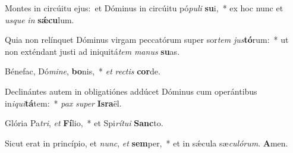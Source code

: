 Montes in circúitu ejus:~\reddagger et Dóminus in circúitu pó\textit{pu}\textit{li} \textbf{su}i,~* ex hoc nunc et \textit{us}\textit{que} \textit{in} \textbf{sǽ}\textbf{cu}lum.

Quia non relínquet Dóminus virgam peccatórum super sor\textit{tem} \textit{jus}\textbf{tó}rum:~* ut non exténdant justi ad iniquitá\textit{tem} \textit{ma}\textit{nus} \textbf{su}as.

Bénefac, Dó\textit{mi}\textit{ne}, \textbf{bo}nis,~* \textit{et} \textit{rec}\textit{tis} \textbf{cor}de.

Declinántes autem in obligatiónes addúcet Dóminus cum operántibus in\textit{i}\textit{qui}\textbf{tá}tem:~* \textit{pax} \textit{su}\textit{per} \textbf{Is}\textbf{ra}ël.

Glória Pa\textit{tri}, \textit{et} \textbf{Fí}lio,~* et Spi\textit{rí}\textit{tu}\textit{i} \textbf{Sanc}to.

Sicut erat in princípio, et \textit{nunc}, \textit{et} \textbf{sem}per,~* et in sǽcula sæ\textit{cu}\textit{ló}\textit{rum}. \textbf{A}men.
